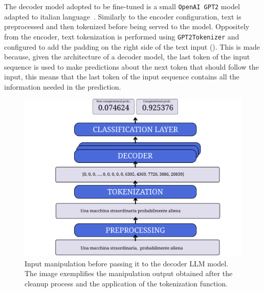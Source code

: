 \documentclass[11pt]{article}
\begin{document}
The decoder model adopted to be fine-tuned is a small \texttt{OpenAI GPT2} model adapted to italian language~\cite{de-vries-nissim-2021-good}.
%
Similarly to the encoder configuration,
text is preprocessed and then tokenized before being served to the model.
%
Oppositely from the encoder,
text tokenization is performed using \texttt{GPT2Tokenizer}
and configured to add the padding on the right side of the text input ().
%
This is made because, given the architecture of a decoder model,
the last token of the input sequence is used to make predictions about the next token that should follow the input,
this means that the last token of the input sequence contains all the information needed in the prediction.
%
\begin{figure}
  \centering
  \includegraphics[width=\linewidth]{figures/decoder.pdf}
  \caption{
    Input manipulation before passing it to the decoder LLM model.
    The image exemplifies the manipulation output obtained after the cleanup process and the application of the tokenization function.
  }
  \label{fig:preprocessing-and-tokenization-decoder}
\end{figure}
\end{document}
